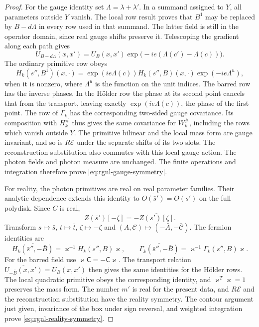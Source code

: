 \begin{proof}
For the gauge identity set $\Lambda=\lambda+\lambda'$.
In a summand assigned to $Y$, all parameters outside $Y$
vanish. The local row result proves that $B^1$ may be
replaced by $B-d\Lambda$ in every row used in that
summand. The latter field is still in the operator domain,
since real gauge shifts preserve it.
Telescoping the gradient along each path gives
\[
 U_{B-d\Lambda}(x,x')
       =U_B(x,x')\exp\big(-ie(\Lambda(c')-\Lambda(c))\big).
\]
The ordinary primitive row obeys
\[
 H_k(s'',B^1)(x,\cdot)
       =\exp(ie\Lambda(c))H_k(s'',B)(x,\cdot)
                                                 \exp(-ie\Lambda^u),
\]
when it is nonzero, where $\Lambda^u$ is the function
on the unit indices. The barred row has the inverse
phases. In the H\"older row the phase at its second
point cancels that from the transport, leaving exactly
$\exp(ie\Lambda(c))$, the phase of the first point.
The row of $\Gamma_k$ has the corresponding two-sided
gauge covariance. Its composition with $H_k^\#$ thus
gives the same covariance for $W_k^\#$, including the
rows which vanish outside $Y$.
The primitive bilinear and the local mass form are
gauge invariant, and so is $R\mathscr E$ under the
separate shifts of its two slots. The reconstruction
substitution also commutes with this local gauge action.
The photon fields and photon measure are unchanged.
The finite operations and integration therefore prove
\eqref{eq:rgnl-gauge-symmetry}.

For reality, the photon primitives are real on real
parameter families. Their analytic dependence extends
this identity to
$\overline{O(\bar s')}=O(s')$ on the full polydisk.
Since $C$ is real,
\[
 Z(\bar s')[-\zeta]=-\overline{Z(s')[\zeta]}.
\]
Transform $s\mapsto\bar s$, $t\mapsto\bar t$,
$\zeta\mapsto-\zeta$ and
$(A,\mathscr C)\mapsto(-\bar A,-\overline{\mathscr C})$.
The fermion identities are
\[
 \overline{H_k(\bar s'',-\bar B)}
                         =\varkappa^{-1}H_k(s'',B)\varkappa,\qquad
 \overline{\Gamma_k(\bar s'',-\bar B)}
                         =\varkappa^{-1}\Gamma_k(s'',B)\varkappa.
\]
For the barred field use
$\varkappa\mathsf C=-\mathsf C\varkappa$.
The transport relation
$\overline{U_{-\bar B}(x,x')}=U_B(x,x')$
then gives the same identities for the H\"older rows.
The local quadratic primitive obeys the corresponding
identity, and $\varkappa^T\varkappa=1$ preserves the
mass form. The number $m'$ is real for the present data,
and $R\mathscr E$ and the reconstruction substitution
have the reality symmetry. The contour argument just
given, invariance of the box under sign reversal, and
weighted integration prove
\eqref{eq:rgnl-reality-symmetry}.


\end{proof}
